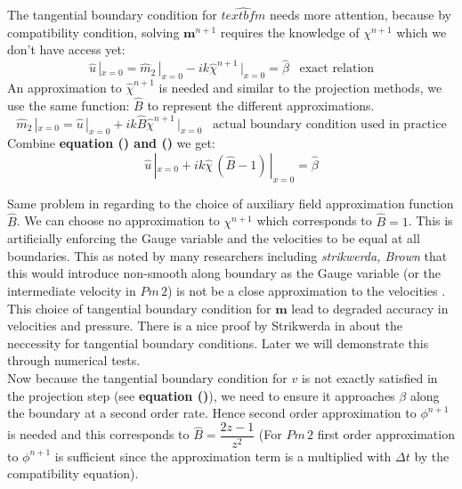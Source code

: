 The tangential boundary condition for $\hat{textbf{m}}$ needs more attention, because by compatibility condition, solving $\textbf{m}^{n+1}$ requires the knowledge of $\chi^{n+1}$ which we don't have access yet:
\begin{equation}
\hat{u}\,|_{x=0} = \hat{m}_2\,|_{x=0} - ik \hat{\chi}^{n+1}\,|_{x=0} = \hat{\beta}\,\,\,\text{   exact relation}
\end{equation}
An approximation to $\hat{\chi}^{n+1}$ is needed and similar to the projection methods, we use the same function: $\hat{B}$ to represent the different approximations.\\
\begin{equation}
\hat{m}_2\,|_{x=0} = \hat{u}\,|_{x=0} + ik \hat{B}\hat{\chi}^{n+1}\,|_{x=0} \,\,\,\text{   actual boundary condition used in practice}
\end{equation}
Combine \textbf{equation () and ()} we get:
\begin{equation}
\hat{u}\,|_{x=0} + ik \hat{\chi}\,(\hat{B}-1)\,|_{x=0} = \hat{\beta}
\end{equation}

Same problem in regarding to the choice of auxiliary field approximation function $\hat{B}$. We can choose no approximation to $\chi^{n+1}$ which corresponds to $\hat{B} = 1$. This is artificially enforcing the Gauge variable and the velocities to be equal at all boundaries. This as noted by many researchers including \emph{strikwerda, Brown} that this would introduce non-smooth along boundary as the Gauge variable (or the intermediate velocity in $Pm\,2$) is not be a close approximation to the velocities \cite{strikwerda1999accuracy, brown2001accurate}. This choice of tangential boundary condition for $\textbf{m}$ lead to degraded accuracy in velocities and pressure. There is a nice proof by Strikwerda in \cite{strikwerda1999accuracy} about the neccessity for tangential boundary conditions. Later we will demonstrate this through numerical tests.\\

Now because the tangential boundary condition for $v$ is not exactly satisfied in the projection step (see \textbf{equation ()}), we need to ensure it approaches $\beta$ along the boundary at a second order rate. Hence second order approximation to $\phi^{n+1}$ is needed and this corresponds to $\hat{B} = \dfrac{2z-1}{z^2}$ (For $Pm\,2$ first order approximation to $\phi^{n+1}$ is sufficient since the approximation term is a multiplied with $\Delta t$ by the compatibility equation).\\

